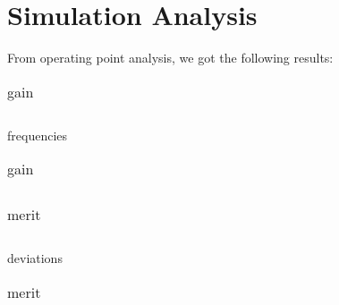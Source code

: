 \section{Simulation Analysis}
\label{sec:simulation} 

From operating point analysis, we got the following results:
%    



%    



\FloatBarrier  
\begin{table}

\parbox{.45\linewidth}{
\centering
\begin{tabular}{|c|c|c|c|c|}
    \hline
    

  \end{tabular}
  \caption{frequencies}
}

\hfill
\parbox{.45\linewidth}{
\centering
\begin{tabular}{|c|c|c|c|c|}
    \hline    
    

  \end{tabular}
  \caption{gain}
}

\end{table}
\FloatBarrier  


\FloatBarrier  
\begin{table}
\parbox{.45\linewidth}{
\centering
\begin{tabular}{|c|c|c|c|c|}
    \hline    
    
  \end{tabular}
  \caption{deviations}
}

\hfill
\parbox{.45\linewidth}{
\centering
\begin{tabular}{|c|c|c|c|}
    \hline    
    
  \end{tabular}
  \caption{merit}
  \label{tab:Spice1}
}
\end{table}
\FloatBarrier  



